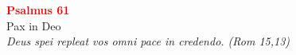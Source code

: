 


\def\greinitialformat#1{%
{\fontsize{39}{39}\selectfont #1}%
}




\vspace{0.3cm}
\begin{center}
 \textcolor{red}{\large \bf Psalmus 61}\\
Pax in Deo\\
\textit{\small Deus spei repleat vos omni pace in credendo. (Rom 15,13)}
\end{center}

